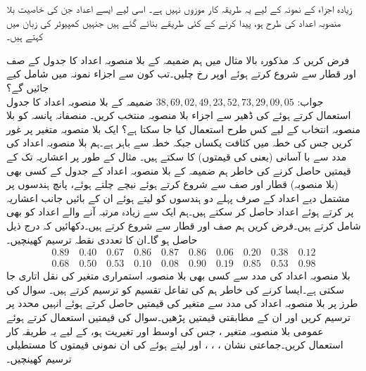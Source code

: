 زیادہ اجزاء کے نمونہ کے لیے  یہ طریقہ کار  موزوں نہیں ہے۔ اسی لیے  ایسے اعداد جن کی خاصیت بلا منصوبہ اعداد کی طرح ہو،  پیدا کرنے کے کئی طریقے بنائے گئے ہیں جنہیں کمپیوٹر کی زبان میں  کہتے ہیں۔

\quad
فرض کریں کہ مذکورہ بالا مثال میں ہم ضمیمہ  کے بلا منصوبہ اعداد کا جدول کے صف  اور قطار  سے شروع کرتے ہوئے اوپر رخ چلیں۔تب کون سے اجزاء نمونہ میں شامل کیے جائیں گے؟\\
جواب:\quad
$38,69,02,49,23,52,73,29,09,05$
\quad
ضمیمہ  کے بلا منصوبہ اعداد کا جدول استعمال کرتے ہوئے  کی ڈھیر سے  اجزاء بلا منصوبہ منتخب کریں۔
\quad
منصفانہ پانسہ کو بلا منصوبہ انتخاب کے لیے کس طرح استعمال کیا جا سکتا ہے؟
\quad
ایک بلا منصوبہ متغیر  پر غور کریں جس کی خطہ  میں کثافت یکساں   جبکہ خطہ سے باہر  ہے۔ہم بلا منصوبہ اعداد کی مدد سے با آسانی  (یعنی  کی قیمتوں) کا   سکتے ہیں۔ مثال کے طور پر  اعشاریہ تک کے  قیمتیں حاصل کرنے کی خاطر ہم ضمیمہ  کے بلا منصوبہ اعداد کے جدول کے کسی بھی (بلا منصوبہ) قطار اور صف سے شروع کرتے ہوئے نیچے چلتے ہوئے، پانچ ہندسوں پر مشتمل دیے اعداد کے صرف پہلے دو ہندسوں کو لیتے ہوئے ان کے بائیں جانب اعشاریہ پر کرتے ہوئے اعداد حاصل کر سکتے ہیں۔ہم ایک سے زیادہ مرتبہ آنے والے اعداد کو بھی شامل کرتے ہیں۔فرض کریں ہم صف  اور قطار  سے شروع کرتے ہیں۔دکھائیں کہ درج ذیل حاصل ہو گا۔ان کا تعددی نقطہ ترسیم کھینچیں۔
\begin{align*}
0.89\quad 0.40\quad 0.67\quad 0.86\quad 0.87\quad 0.86\quad 0.06\quad 0.20\quad 0.38\quad 0.12\\
0.68\quad 0.50\quad 0.53\quad 0.10\quad 0.08\quad 0.90\quad 0.19\quad 0.85\quad 0.53\quad 0.98
\end{align*}
\quad
بلا منصوبہ اعداد کی مدد سے کسی بھی بلا منصوبہ استمراری متغیر  کی نقل اتاری جا سکتی ہے۔ایسا کرنے کی خاطر ہم  کی تفاعل تقسیم کو ترسیم کرتے ہیں۔ سوال  کی طرز پر بلا منصوبہ اعداد کی مدد سے متغیر  کی قیمتیں حاصل کرتے ہوئے انہیں  محدد پر ترسیم کریں اور ان کے مطابقتی  قیمتیں پڑھیں۔سوال  کی قیمتیں استعمال کرتے ہوئے عمومی بلا منصوبہ متغیر ، جس کی اوسط  اور تغیریت  ہو، کے لیے یہ طریقہ کار استعمال کریں۔جماعتی نشان ، ، ،  اور  لیتے ہوئے   کی ان  نمونی قیمتوں کا مستطیلی ترسیم  کھینچیں۔\\

